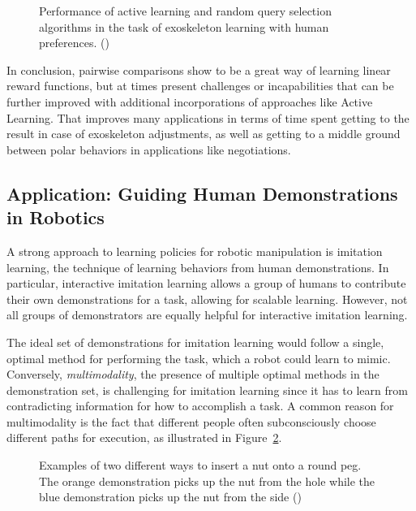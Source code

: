 \documentclass[
  letterpaper,
  numbers=noenddot,
  DIV=11]{scrreprt}
\theoremstyle{definition}
\theoremstyle{plain}
\theoremstyle{plain}
\theoremstyle{remark}
\begin{document}
\begin{figure}


\caption{\label{fig-robotics}Performance of active learning and random
query selection algorithms in the task of exoskeleton learning with
human preferences. ()}

\end{figure}%

In conclusion, pairwise comparisons show to be a great way of learning
linear reward functions, but at times present challenges or
incapabilities that can be further improved with additional
incorporations of approaches like Active Learning. That improves many
applications in terms of time spent getting to the result in case of
exoskeleton adjustments, as well as getting to a middle ground between
polar behaviors in applications like negotiations.

\subsection{Application: Guiding Human Demonstrations in
Robotics}\label{application-guiding-human-demonstrations-in-robotics}

A strong approach to learning policies for robotic manipulation is
imitation learning, the technique of learning behaviors from human
demonstrations. In particular, interactive imitation learning allows a
group of humans to contribute their own demonstrations for a task,
allowing for scalable learning. However, not all groups of demonstrators
are equally helpful for interactive imitation learning.

The ideal set of demonstrations for imitation learning would follow a
single, optimal method for performing the task, which a robot could
learn to mimic. Conversely, \emph{multimodality}, the presence of
multiple optimal methods in the demonstration set, is challenging for
imitation learning since it has to learn from contradicting information
for how to accomplish a task. A common reason for multimodality is the
fact that different people often subconsciously choose different paths
for execution, as illustrated in Figure~\ref{fig-multimodalexecution}.

\begin{figure}


\caption{\label{fig-multimodalexecution}Examples of two different ways
to insert a nut onto a round peg. The orange demonstration picks up the
nut from the hole while the blue demonstration picks up the nut from the
side ()}

\end{figure}%
\end{document}
